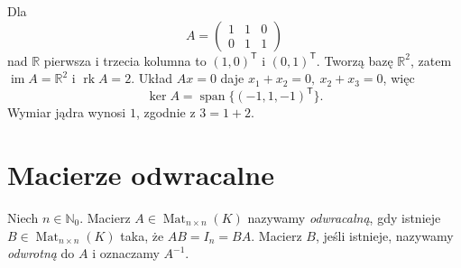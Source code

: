 \begin{przyklad}
\label{prz:lin4-rzad-prostokatnej}
Dla
\[
 A=\begin{pmatrix}1&1&0\\0&1&1\end{pmatrix}
\]
nad \(\mathbb R\) pierwsza i trzecia kolumna
to \((1,0)^{\mathsf T}\) i \((0,1)^{\mathsf T}\).
Tworzą bazę \(\mathbb R^2\), zatem
\(\operatorname{im}A=\mathbb R^2\)
i \(\operatorname{rk}A=2\).
Układ \(Ax=0\) daje
\(x_1+x_2=0,\ x_2+x_3=0\), więc
\[
 \ker A=\operatorname{span}\{
 (-1,1,-1)^{\mathsf T}\}.
\]
Wymiar jądra wynosi \(1\), zgodnie z
\(3=1+2\).
\end{przyklad}

\section{Macierze odwracalne}
\label{sec:lin4-odwracalne}

\begin{definicja}
\label{def:lin4-odwracalna}
Niech \(n\in\mathbb N_0\).
Macierz \(A\in\operatorname{Mat}_{n\times n}(K)\)
nazywamy \emph{odwracalną}, gdy istnieje
\(B\in\operatorname{Mat}_{n\times n}(K)\)
taka, że \(AB=I_n=BA\).
Macierz \(B\), jeśli istnieje, nazywamy
\emph{odwrotną} do \(A\) i oznaczamy \(A^{-1}\).
\end{definicja}

